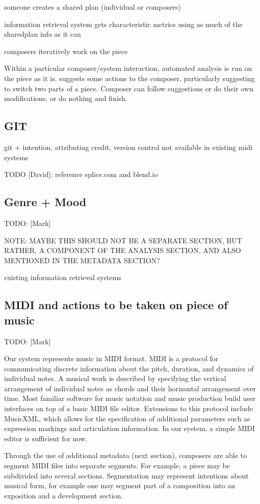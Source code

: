 \documentclass[final,authoryear,11pt,times]{elsarticle}
\begin{document}
someone creates a shared plan (individual or composers)

information retrieval system gets characteristic metrics using as much of the sharedplan info as it can

composers iteratively work on the piece

Within a particular composer/system interaction, automated analysis is run on the piece as it is.
suggests some actions to the composer, particularly suggesting to switch two parts of a piece.
Composer can follow suggestions or do their own modifications, or do nothing and finish.

\subsection{GIT}

git + intention, attributing credit, version control not available in existing midi systems

TODO [David]: reference splice.com and blend.io


\subsection{Genre + Mood}

TODO: [Mark]


NOTE: MAYBE THIS SHOULD NOT BE A SEPARATE SECTION, BUT RATHER, A COMPONENT OF THE ANALYSIS SECTION, AND ALSO MENTIONED IN THE METADATA SECTION?

existing information retrieval systems

\subsection{MIDI and actions to be taken on piece of music}
TODO: [Mark]

Our system represents music in MIDI format. MIDI is a protocol for communicating discrete information about the pitch, duration, and dynamics of individual notes. A musical work is described by specifying the vertical arrangement of individual notes as chords and their horizontal arrangement over time. Most familiar software for music notation and music production build user interfaces on top of a basic MIDI file editor. Extensions to this protocol include MusicXML, which allows for the specification of additional parameters such as expression markings and articulation information. In our system, a simple MIDI editor is sufficient for now.

Through the use of additional metadata (next section), composers are able to segment MIDI files into separate segments. For example, a piece may be subdivided into several sections. Segmentation may represent intentions about musical form, for example one may segment part of a composition into an exposition and a development section.
\end{document}
